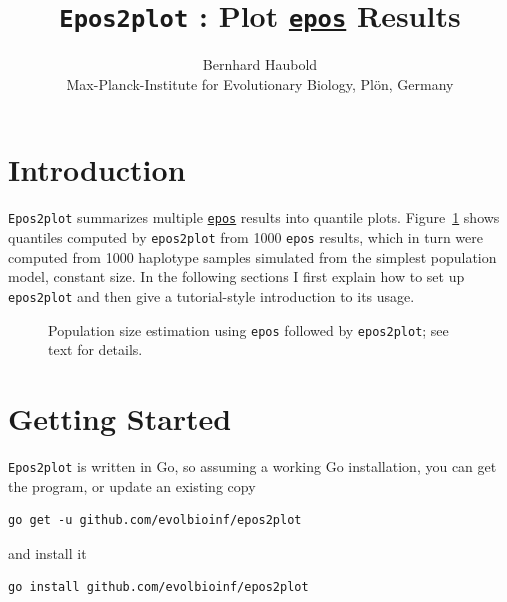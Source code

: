 \documentclass[a4paper]{article}
\newcommand{\ty}{\texttt}
\begin{document}
\title{\ty{Epos2plot} : Plot \href{http://github.com/evolbioinf/epos}{\ty{epos}} Results}
\author{Bernhard Haubold\\\small Max-Planck-Institute for Evolutionary
  Biology, Pl\"on, Germany}
\date{}
\maketitle
\section{Introduction}
\ty{Epos2plot} summarizes multiple
\href{http://github.com/evolbioinf/epos}{\ty{epos}} results into
quantile plots. Figure~\ref{fig:qua} shows quantiles
computed by \ty{epos2plot} from 1000 \ty{epos} results, which in turn
were computed from 1000 haplotype samples simulated
from the simplest population model, constant size. In the following
sections I first explain how to set up \ty{epos2plot} and then give a
tutorial-style introduction to its usage.

\begin{figure}
  \begin{center}
    \scalebox{0.6}{}
  \end{center}
  \caption{Population size estimation using \ty{epos} followed by
    \ty{epos2plot}; see text for details.}\label{fig:qua}
\end{figure}

\section{Getting Started}
\ty{Epos2plot} is written in Go, so assuming a working Go
installation, you can get the program, or update an existing copy
\begin{verbatim}
go get -u github.com/evolbioinf/epos2plot
\end{verbatim}
and install it
\begin{verbatim}
go install github.com/evolbioinf/epos2plot
\end{verbatim}
\end{document}
